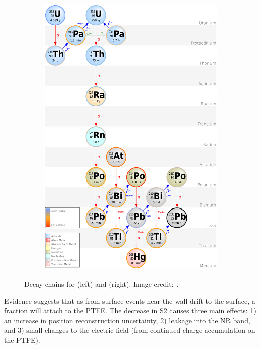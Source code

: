 \begin{figure}
\begin{subfigure}[t]{0.5\textwidth}
    \end{subfigure}%
    \begin{subfigure}[t]{0.5\textwidth}
        \centering
        \includegraphics[width=\textwidth]{Decay_Chain_of_Uranium-238}
    \end{subfigure}
    \caption{Decay chains for  (left) and  (right).  Image credit: .}
	\label{fig:backgrounds_decay_chains}
\end{figure}

Evidence suggests that as \electron from surface events near the wall drift to the surface, a fraction will attach to the PTFE.  The
decrease in S2 causes three main effects: 1)
an increase in position reconstruction uncertainty, 2) leakage into the NR band, and 3) small changes to the electric field (from
continued charge accumulation on the PTFE).

